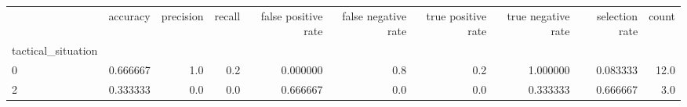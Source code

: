 \begin{tabular}{lrrrrrrrrr}
\toprule
{} &  accuracy &  precision &  recall &  false positive rate &  false negative rate &  true positive rate &  true negative rate &  selection rate &  count \\
tactical\_situation &           &            &         &                      &                      &                     &                     &                 &        \\
\midrule
0                  &  0.666667 &        1.0 &     0.2 &             0.000000 &                  0.8 &                 0.2 &            1.000000 &        0.083333 &   12.0 \\
2                  &  0.333333 &        0.0 &     0.0 &             0.666667 &                  0.0 &                 0.0 &            0.333333 &        0.666667 &    3.0 \\
\bottomrule
\end{tabular}
